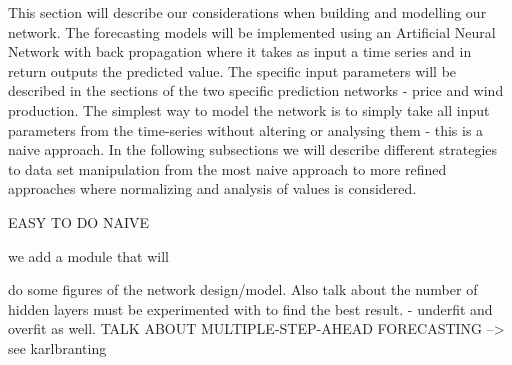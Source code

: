 This section will describe our considerations when building and modelling our network. The forecasting models will be implemented using an Artificial Neural Network with back propagation where it takes as input a time series and in return outputs the predicted value. The specific input parameters will be described in the sections of the two specific prediction networks - price and wind production. 
The simplest way to model the network is to simply take all input parameters from the time-series without altering or analysing them - this is a naive approach. In the following subsections we will describe different strategies to data set manipulation from the most naive approach to more refined approaches where normalizing and analysis of values is considered.



  EASY TO DO NAIVE

we add a module that will 



do some figures of the network design/model. Also talk about the number of hidden layers must be experimented with to find the best result. - underfit and overfit as well.
TALK ABOUT MULTIPLE-STEP-AHEAD FORECASTING --> see karlbranting